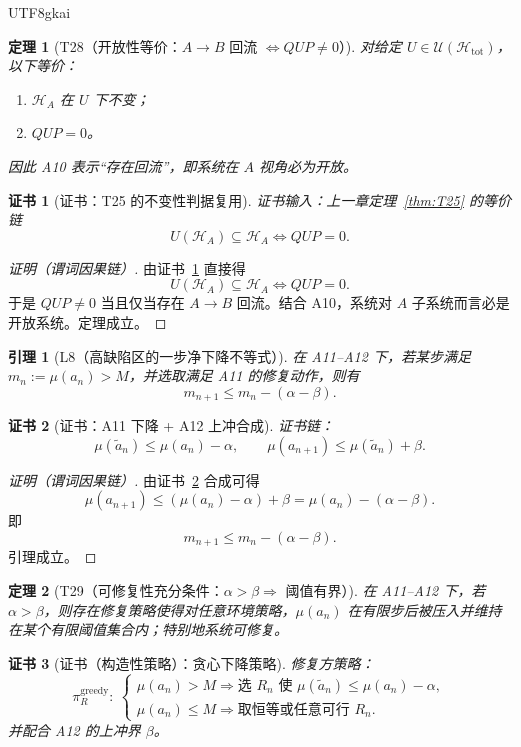 \documentclass[12pt]{article}
\newtheorem{theorem}{定理}[section]
\newtheorem{lemma}{引理}[section]
\newtheorem{Certificate}{证书}[section]
\begin{document}
\begin{CJK*}{UTF8}{gkai}
\begin{theorem}[T28（开放性等价：$A\to B$ 回流 $\Leftrightarrow QUP\neq 0$）]
\label{thm:T28}
对给定 $U\in\mathcal U(\mathcal H_{\mathrm{tot}})$，以下等价：
\begin{enumerate}
\item $\mathcal H_A$ 在 $U$ 下不变；
\item $QUP=0$。
\end{enumerate}
因此 A10 表示“存在回流”，即系统在 $A$ 视角必为开放。
\end{theorem}

\begin{Certificate}[证书：T25 的不变性判据复用]
\label{cert:T28}
证书输入：上一章定理~\ref{thm:T25} 的等价链
\[
U(\mathcal H_A)\subseteq\mathcal H_A\Longleftrightarrow QUP=0.
\]
\end{Certificate}

\begin{proof}[证明（谓词因果链）]
由证书~\ref{cert:T28} 直接得
\[
U(\mathcal H_A)\subseteq\mathcal H_A\Longleftrightarrow QUP=0.
\]
于是 $QUP\neq0$ 当且仅当存在 $A\to B$ 回流。结合 A10，系统对 $A$ 子系统而言必是开放系统。定理成立。
\end{proof}

\begin{lemma}[L8（高缺陷区的一步净下降不等式）]
\label{lem:L8}
在 A11--A12 下，若某步满足 $m_n:=\mu(a_n)>M$，并选取满足 A11 的修复动作，则有
\[
m_{n+1}\le m_n-(\alpha-\beta).
\]
\end{lemma}

\begin{Certificate}[证书：A11 下降 + A12 上冲合成]
\label{cert:L8}
证书链：
\[
\mu(\tilde a_n)\le \mu(a_n)-\alpha,\qquad
\mu(a_{n+1})\le \mu(\tilde a_n)+\beta.
\]
\end{Certificate}

\begin{proof}[证明（谓词因果链）]
由证书~\ref{cert:L8} 合成可得
\[
\mu(a_{n+1})\le (\mu(a_n)-\alpha)+\beta=\mu(a_n)-(\alpha-\beta).
\]
即
\[
m_{n+1}\le m_n-(\alpha-\beta).
\]
引理成立。
\end{proof}

\begin{theorem}[T29（可修复性充分条件：$\alpha>\beta\Rightarrow$ 阈值有界）]
\label{thm:T29}
在 A11--A12 下，若 $\alpha>\beta$，则存在修复策略使得对任意环境策略，$\mu(a_n)$ 在有限步后被压入并维持在某个有限阈值集合内；特别地系统可修复。
\end{theorem}

\begin{Certificate}[证书（构造性策略）：贪心下降策略]
\label{cert:T29}
修复方策略：
\[
\pi_R^{\mathrm{greedy}}:\
\begin{cases}
\mu(a_n)>M\Rightarrow \text{选 }R_n\text{ 使 }\mu(\tilde a_n)\le \mu(a_n)-\alpha,\\
\mu(a_n)\le M\Rightarrow \text{取恒等或任意可行 }R_n.
\end{cases}
\]
并配合 A12 的上冲界 $\beta$。
\end{Certificate}


\end{CJK*}
\end{document}
